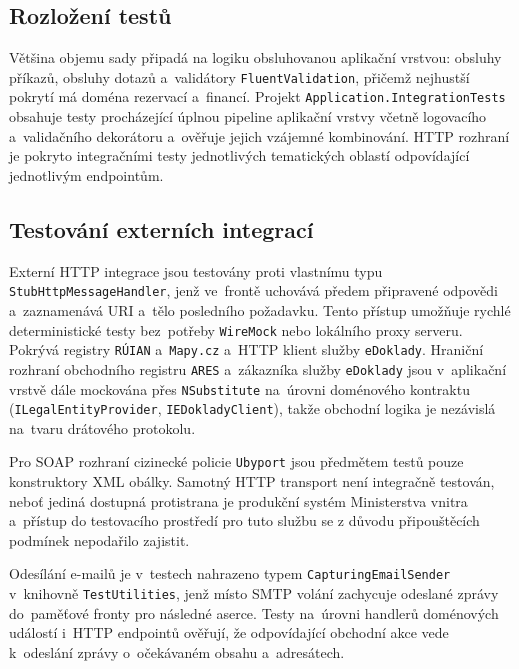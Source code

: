\subsection{Rozložení testů}
\label{subsec:test-distribution}

Většina objemu sady připadá na logiku obsluhovanou aplikační vrstvou: obsluhy příkazů, obsluhy dotazů a~validátory \texttt{FluentValidation}, přičemž nejhustší pokrytí má doména rezervací a~financí.
Projekt \texttt{Application.IntegrationTests} obsahuje testy procházející úplnou pipeline aplikační vrstvy včetně logovacího a~validačního dekorátoru a~ověřuje jejich vzájemné kombinování.
HTTP rozhraní je pokryto integračními testy jednotlivých tematických oblastí odpovídající jednotlivým endpointům.

\subsection{Testování externích integrací}
\label{subsec:test-integrations}

Externí HTTP integrace jsou testovány proti vlastnímu typu \texttt{StubHttpMessageHandler}, jenž ve~frontě uchovává předem připravené odpovědi a~zaznamenává URI a~tělo posledního požadavku.
Tento přístup umožňuje rychlé deterministické testy bez~potřeby \texttt{WireMock} nebo lokálního proxy serveru.
Pokrývá registry \texttt{RÚIAN} a~\texttt{Mapy.cz} a~HTTP klient služby \texttt{eDoklady}.
Hraniční rozhraní obchodního registru \texttt{ARES} a~zákazníka služby \texttt{eDoklady} jsou v~aplikační vrstvě dále mockována přes \texttt{NSubstitute} na~úrovni doménového kontraktu (\texttt{ILegalEntityProvider}, \texttt{IEDokladyClient}), takže obchodní logika je nezávislá na~tvaru drátového protokolu.

Pro SOAP rozhraní cizinecké policie \texttt{Ubyport} jsou předmětem testů pouze konstruktory XML obálky.
Samotný HTTP transport není integračně testován, neboť jediná dostupná protistrana je produkční systém Ministerstva vnitra a~přístup do testovacího prostředí pro tuto službu se z důvodu připouštěcích podmínek nepodařilo zajistit.

Odesílání e-mailů je v~testech nahrazeno typem \texttt{CapturingEmailSender} v~knihovně \texttt{TestUtilities}, jenž místo SMTP volání zachycuje odeslané zprávy do~paměťové fronty pro následné aserce.
Testy na~úrovni handlerů doménových událostí i~HTTP endpointů ověřují, že odpovídající obchodní akce vede k~odeslání zprávy o~očekávaném obsahu a~adresátech.

